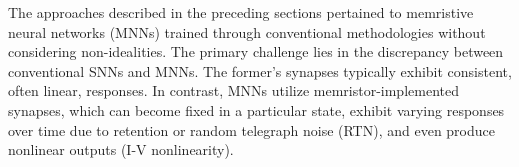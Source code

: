 

\noindent The approaches described in the preceding sections pertained to memristive neural networks (MNNs) trained through conventional methodologies without considering non-idealities. The primary challenge lies in the discrepancy between conventional SNNs and MNNs. The former's synapses typically exhibit consistent, often linear, responses. In contrast, MNNs utilize memristor-implemented synapses, which can become fixed in a particular state, exhibit varying responses over time due to retention or random telegraph noise (RTN), and even produce nonlinear outputs (I-V nonlinearity).\\



